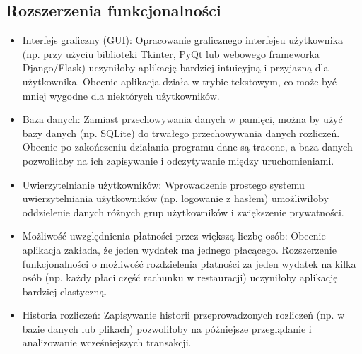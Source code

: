 \documentclass{article}
\begin{document}
\subsection{Rozszerzenia funkcjonalności}
\begin{itemize}
\item Interfejs graficzny (GUI): Opracowanie graficznego interfejsu użytkownika (np. przy użyciu biblioteki Tkinter, PyQt lub webowego frameworka Django/Flask) uczyniłoby aplikację bardziej intuicyjną i przyjazną dla użytkownika. Obecnie aplikacja działa w trybie tekstowym, co może być mniej wygodne dla niektórych użytkowników.
\item Baza danych: Zamiast przechowywania danych w pamięci, można by użyć bazy danych (np. SQLite) do trwałego przechowywania danych rozliczeń. Obecnie po zakończeniu działania programu dane są tracone, a baza danych pozwoliłaby na ich zapisywanie i odczytywanie między uruchomieniami.
\item Uwierzytelnianie użytkowników: Wprowadzenie prostego systemu uwierzytelniania użytkowników (np. logowanie z hasłem) umożliwiłoby oddzielenie danych różnych grup użytkowników i zwiększenie prywatności.
\item Możliwość uwzględnienia płatności przez większą liczbę osób: Obecnie aplikacja zakłada, że jeden wydatek ma jednego płacącego. Rozszerzenie funkcjonalności o możliwość rozdzielenia płatności za jeden wydatek na kilka osób (np. każdy płaci część rachunku w restauracji) uczyniłoby aplikację bardziej elastyczną.
\item Historia rozliczeń: Zapisywanie historii przeprowadzonych rozliczeń (np. w bazie danych lub plikach) pozwoliłoby na późniejsze przeglądanie i analizowanie wcześniejszych transakcji.
\end{itemize}
\end{document}
